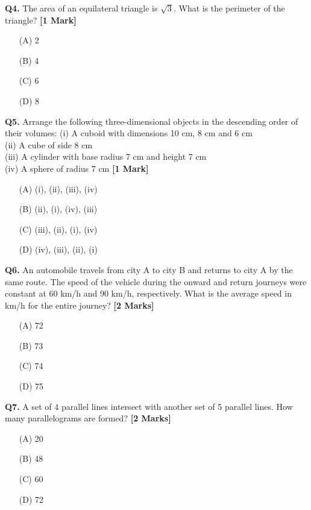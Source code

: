 \documentclass[11pt]{article}
\newcommand{\questiona}[2]{
    \noindent\textbf{Q#2.} #1 \hfill \textbf{[1 Mark]}
}
\newcommand{\questionb}[2]{
    \noindent\textbf{Q#2.} #1 \hfill \textbf{[2 Marks]}
}
\begin{document}
\questiona{The area of an equilateral triangle is \(\sqrt{3}\). What is the perimeter of the triangle?}{4}
\begin{enumerate}
    \item[(A)] 2
    \item[(B)] 4
    \item[(C)] 6
    \item[(D)] 8
\end{enumerate}
\vspace{0.5cm}

\questiona{Arrange the following three-dimensional objects in the descending order of their volumes:
(i) A cuboid with dimensions 10 cm, 8 cm and 6 cm \\
(ii) A cube of side 8 cm \\
(iii) A cylinder with base radius 7 cm and height 7 cm \\
(iv) A sphere of radius 7 cm}{5}
\begin{enumerate}
    \item[(A)] (i), (ii), (iii), (iv)
    \item[(B)] (ii), (i), (iv), (iii)
    \item[(C)] (iii), (ii), (i), (iv)
    \item[(D)] (iv), (iii), (ii), (i)
\end{enumerate}
\vspace{0.5cm}

\questionb{An automobile travels from city A to city B and returns to city A by the same route. The speed of the vehicle during the onward and return journeys were constant at 60 km/h and 90 km/h, respectively. What is the average speed in km/h for the entire journey?}{6}
\begin{enumerate}
    \item[(A)] 72
    \item[(B)] 73
    \item[(C)] 74
    \item[(D)] 75
\end{enumerate}
\vspace{0.5cm}

\questionb{A set of 4 parallel lines intersect with another set of 5 parallel lines. How many parallelograms are formed?}{7}
\begin{enumerate}
    \item[(A)] 20
    \item[(B)] 48
    \item[(C)] 60
    \item[(D)] 72
\end{enumerate}
\vspace{0.5cm}
\end{document}

